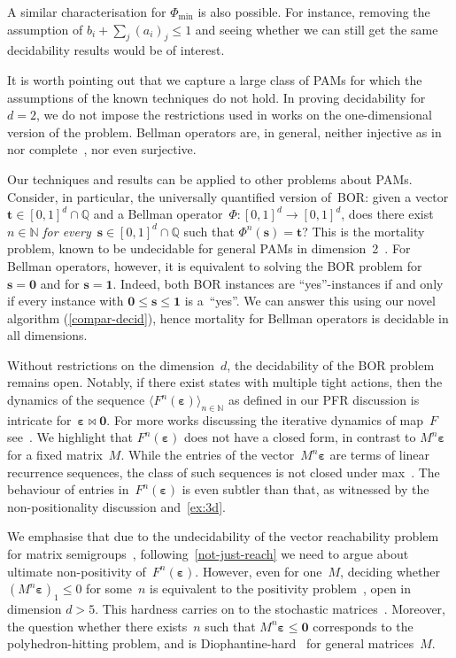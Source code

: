 \documentclass[preprint,12pt]{elsarticle}
\theoremstyle{plain}
\theoremstyle{definition}
\theoremstyle{remark}
\theoremstyle{claimstyle}
\newcommand{\QQ}{\mathbb{Q}}
\newcommand{\NN}{\mathbb{N}}
\newcommand{\eps}{\bm{\varepsilon}}
\begin{document}
A similar characterisation for $\Phi_{\min}$ is also possible. For instance, removing the assumption of $b_i + \sum_{j} (a_{i})_j \leq 1$ and seeing whether 
we can still get the same decidability results would be of interest. 

It is worth pointing out that we capture a large class of PAMs 
for which the assumptions of the known techniques do not hold.
In proving decidability for~$d=2$,
we do not impose the restrictions used in works on the one-dimensional version of the problem.
Bellman operators are, in general, neither injective as in~\cite{ghahremani2023injective} nor complete~\cite{bournez2018onedpam}, nor even surjective.

Our techniques and results can be applied to other problems about PAMs.
Consider, in particular, the universally quantified version of~BOR:
given a vector $\bm{t} \in [0,1]^d\cap \QQ$ and a Bellman operator~$\Phi: [0,1]^d \rightarrow [0,1]^d$,
does there exist~$n \in \NN$ \emph{for every}~$\bm{s} \in [0,1]^d\cap \QQ$ such that $\Phi^n(\bm{s}) = \bm{t}$?
This is the mortality problem, known to be undecidable for general PAMs in dimension~2~\cite{BenAmram2015mortal,blondel2001note}.
For Bellman operators, however, it is equivalent to solving the BOR problem for $\bm{s} = \bm{0}$ and for $\bm{s} = \bm{1}$.
Indeed, both BOR instances are ``yes''-instances if and only if every instance with $\bm{0} \leq \bm{s} \leq \bm{1}$ is a~``yes''.
We can answer this using our novel algorithm (\cref{compar-decid}), hence mortality for Bellman operators is decidable in all dimensions.

Without restrictions on the dimension~$d$,
the decidability of the BOR problem remains open.
Notably, if there exist states with multiple tight actions,
then the dynamics of the sequence $\langle F^n(\eps)\rangle_{n\in \NN}$ as defined in our PFR discussion is intricate for~$\eps \bowtie \bm{0}$.
For more works discussing the iterative dynamics of map~$F$ see~\cite{Sladky1980max,Zijm1984max}.
We highlight that
$F^n(\eps)$ does not have a closed form, in contrast to $M^n\eps$ for a fixed matrix~$M$.
While the entries of the vector~$M^n\eps$ are terms of linear recurrence sequences, 
the class of such sequences is not closed under max~\cite{Heerdt2018maxlrs}.
The behaviour of entries in~$F^n(\eps)$ is even subtler than that, as 
witnessed by the non-positionality discussion and~\cref{ex:3d}.

We emphasise that due to the undecidability of the vector reachability problem
for matrix semigroups~\cite{Bell2008undec}, following~\cref{not-just-reach} we need to argue about ultimate non-positivity of~$F^n(\eps)$. %
However, even for one~$M$, deciding whether $(M^n\eps)_1 \leq 0$ for some~$n$ is equivalent to the positivity problem~\cite{Ouaknine2014pos5}, open in dimension $d > 5$.
This hardness carries on to the stochastic matrices~\cite{Mihir2024ergodic}.
Moreover, the question whether there exists~$n$ 
such that $M^n\eps \leq \bm{0}$
corresponds to the polyhedron-hitting problem, and is Diophantine-hard~\cite{ChonevOW15} for general matrices~$M$.
\end{document}

